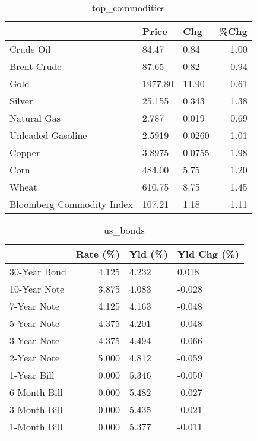 \documentclass{article}%
\begin{document}
\begin{table}[htbp]%
\caption{top\_commodities}%
\centering%
\begin{adjustbox}{width=1\textwidth}%
\begin{tabular}{lllr}
\toprule
                          &   Price &    Chg &  \%Chg \\
\midrule
               Crude Oil  &   84.47 &   0.84 &  1.00 \\
             Brent Crude  &   87.65 &   0.82 &  0.94 \\
                    Gold  & 1977.80 &  11.90 &  0.61 \\
                  Silver  &  25.155 &  0.343 &  1.38 \\
             Natural Gas  &   2.787 &  0.019 &  0.69 \\
       Unleaded Gasoline  &  2.5919 & 0.0260 &  1.01 \\
                  Copper  &  3.8975 & 0.0755 &  1.98 \\
                    Corn  &  484.00 &   5.75 &  1.20 \\
                   Wheat  &  610.75 &   8.75 &  1.45 \\
Bloomberg Commodity Index &  107.21 &   1.18 &  1.11 \\
\bottomrule
\end{tabular}
%
\end{adjustbox}%
\end{table}

%


\begin{table}[htbp]%
\caption{us\_bonds}%
\centering%
\begin{adjustbox}{width=1\textwidth}%
\begin{tabular}{lrll}
\toprule
             &  Rate (\%) & Yld (\%) & Yld Chg (\%) \\
\midrule
30-Year Bond &     4.125 &   4.232 &       0.018 \\
10-Year Note &     3.875 &   4.083 &      -0.028 \\
 7-Year Note &     4.125 &   4.163 &      -0.048 \\
 5-Year Note &     4.375 &   4.201 &      -0.048 \\
 3-Year Note &     4.375 &   4.494 &      -0.066 \\
 2-Year Note &     5.000 &   4.812 &      -0.059 \\
 1-Year Bill &     0.000 &   5.346 &      -0.050 \\
6-Month Bill &     0.000 &   5.482 &      -0.027 \\
3-Month Bill &     0.000 &   5.435 &      -0.021 \\
1-Month Bill &     0.000 &   5.377 &      -0.011 \\
\bottomrule
\end{tabular}
%
\end{adjustbox}%
\end{table}
\end{document}
